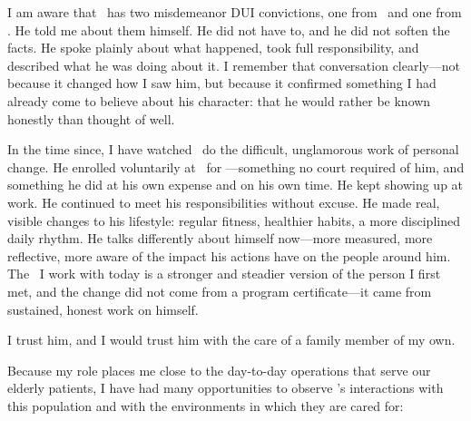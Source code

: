 I am aware that \ApplicantName\ has two misdemeanor DUI convictions, one from \IncidentOneDate\ and one from \IncidentTwoDate. He told me about them himself. He did not have to, and he did not soften the facts. He spoke plainly about what happened, took full responsibility, and described what he was doing about it. I remember that conversation clearly---not because it changed how I saw him, but because it confirmed something I had already come to believe about his character: that he would rather be known honestly than thought of well.

In the time since, I have watched \ApplicantName\ do the difficult, unglamorous work of personal change. He enrolled voluntarily at \RehabProgram\ for \RehabDuration---something no court required of him, and something he did at his own expense and on his own time. He kept showing up at work. He continued to meet his responsibilities without excuse. He made real, visible changes to his lifestyle: regular fitness, healthier habits, a more disciplined daily rhythm. He talks differently about himself now---more measured, more reflective, more aware of the impact his actions have on the people around him. The \ApplicantName\ I work with today is a stronger and steadier version of the person I first met, and the change did not come from a program certificate---it came from sustained, honest work on himself.

I trust him, and I would trust him with the care of a family member of my own.


Because my role places me close to the day-to-day operations that serve our elderly patients, I have had many opportunities to observe \ApplicantName's interactions with this population and with the environments in which they are cared for:


